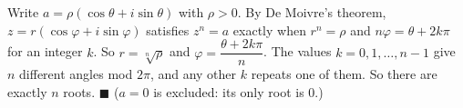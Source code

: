 Write $a=\rho\left(\cos\theta+i\sin\theta\right)$ with $\rho>0$. By De Moivre's theorem, $z=r\left(\cos\varphi+i\sin\varphi\right)$ satisfies $z^n=a$ exactly when $r^n=\rho$ and $n\varphi=\theta+2k\pi$ for an integer $k$. So $r=\sqrt[n]\rho$ and $\varphi=\dfrac{\theta+2k\pi}{n}$. The values $k=0,1,\dots,n-1$ give $n$ different angles mod $2\pi$, and any other $k$ repeats one of them. So there are exactly $n$ roots. $\blacksquare$ ($a=0$ is excluded: its only root is $0$.)
